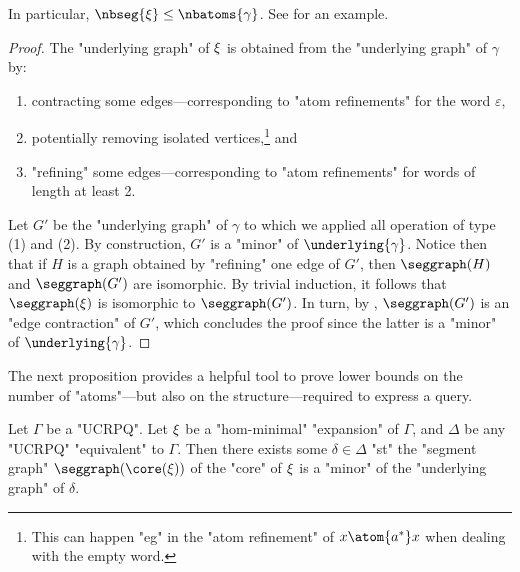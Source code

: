 In particular, $\nbseg{\anexpansion} \leq \nbatoms{\gamma}$.
See  for an example.

\begin{proof}
	The "underlying graph" of $\xi$ is obtained from
	the "underlying graph" of $\gamma$ by:
	\begin{enumerate}
		\item contracting some edges---corresponding to "atom refinements"
			for the word $\varepsilon$,
				 \item potentially removing isolated vertices,\footnote{This can happen "eg" in the "atom refinement" of $x \atom{a^*} x$ when dealing with the empty word.} and
		\item "refining" some edges---corresponding to "atom refinements"
			for words of length at least 2.
	\end{enumerate}
	Let $G'$ be the "underlying graph" of $\gamma$ to which we applied 
	all operation of type (1) and (2). By construction,
	$G'$ is a "minor" of $\underlying{\gamma}$.
	Notice then that if $H$ is a graph obtained by "refining" one edge of $G'$,
	then $\seggraph(H)$ and $\seggraph(G')$ are isomorphic.
	By trivial induction, it follows that $\seggraph(\anexpansion)$
	is isomorphic to $\seggraph(G')$.
	In turn, by , $\seggraph(G')$
	is an "edge contraction" of $G'$, which concludes the proof
	since the latter is a "minor" of $\underlying{\gamma}$.
\end{proof}

The next proposition provides a helpful tool to prove lower bounds on the
number of "atoms"---but also on the structure---required to express a query.
\AP{}

\begin{theorem}
	\AP\label{thm:structure-theorem}
	Let $\Gamma$ be a "UCRPQ".
	Let $\xi$ be a "hom-minimal" "expansion" of $\Gamma$,
	and $\Delta$ be any "UCRPQ" "equivalent" to $\Gamma$.
	Then there exists some $\delta \in \Delta$ "st" the "segment graph" $\seggraph(\core(\anexpansion))$
	of the "core" of $\xi$ is a "minor" of the "underlying graph" of $\delta$. 
\end{theorem}

